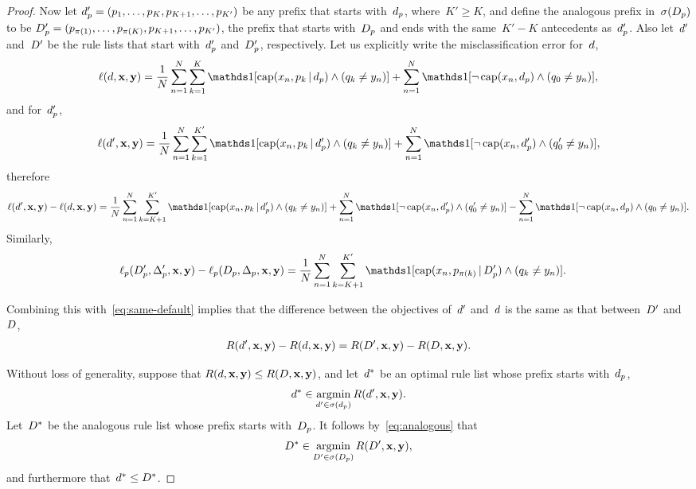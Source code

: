 \begin{proof}
Now let ${d_p' = (p_1, \dots, p_K, p_{K+1}, \dots, p_{K'})}$
be any prefix that starts with~$d_p$, where~${K' \ge K}$,
and define the analogous prefix in~$\sigma(D_p)$ to be
${D_p' = (p_{\pi(1)}, \dots, p_{\pi(K)}, p_{K+1}, \dots, p_{K'})}$,
\ie the prefix that starts with~$D_p$
and ends with the same~${K'-K}$ antecedents as~$d_p'$.
%
Also let~${d}'$ and~${D}'$ be the rule lists that
start with~$d_p'$ and~$D_p'$, respectively.
%
Let us explicitly write the misclassification error for~${d}$,
\begin{align}
\Loss(\RL, \x, \y) = \frac{1}{N} \sum_{n=1}^N \sum_{k=1}^K
\one [ \Cap(x_n, p_k \given \Prefix) \wedge (q_k \neq y_n) ]
+ \sum_{n=1}^N \one [ \neg\, \Cap(x_n, \Prefix) \wedge (\Default \neq y_n) ],
\end{align}
and for~$d_p'$,
\begin{align}
\Loss(\RL', \x, \y) = \frac{1}{N} \sum_{n=1}^N \sum_{k=1}^{K'}
\one [ \Cap(x_n, p_k \given \Prefix') \wedge (q_k \neq y_n) ]
+ \sum_{n=1}^N \one [ \neg\, \Cap(x_n, \Prefix') \wedge (\Default' \neq y_n) ],
\end{align}
therefore
\begin{align}
\Loss(\RL', \x, \y) - \Loss(\RL, \x, \y)
= \frac{1}{N} \sum_{n=1}^N \sum_{k=K+1}^{K'}
\one [ \Cap(x_n, p_k \given \Prefix') \wedge (q_k \neq y_n) ]
+ \sum_{n=1}^N \one [ \neg\, \Cap(x_n, \Prefix') \wedge (\Default' \neq y_n) ]
- \sum_{n=1}^N \one [ \neg\, \Cap(x_n, \Prefix) \wedge (\Default \neq y_n) ].
\label{eq:loss-a}
\end{align}
Similarly,
\begin{align}
\Loss_p(\PrefixB', \LabelsB', \x, \y) - \Loss_p(\PrefixB, \LabelsB, \x, \y)
&= \frac{1}{N} \sum_{n=1}^N \sum_{k=K+1}^{K'}
\one [ \Cap(x_n, p_{\pi(k)} \given \PrefixB') \wedge (q_k \neq y_n) ].
\label{eq:loss-b}
\end{align}

%
Combining this with~\eqref{eq:same-default} implies that
the difference between the objectives of~${d}'$ and~${d}$
is the same as that between~${D}'$ and~${D}$, \ie
\begin{align}
\Obj(\RL', \x, \y) - \Obj(\RL, \x, \y)
= \Obj(\RLB', \x, \y) - \Obj(\RLB, \x, \y).
\label{eq:analogous}
\end{align}

Without loss of generality, suppose that
${R({d}, \mathbf{x}, \mathbf{y}) \le R({D}, \mathbf{x}, \mathbf{y})}$,
and let~${d}^*$ be an optimal rule list whose prefix starts with~$d_p$,
\begin{align}
\RL^* \in \argmin_{\RL' \in \StartsWith(\Prefix)} \Obj(\RL', \x, \y).
\end{align}
Let~${D}^*$ be the analogous rule list whose prefix starts with~$D_p$.
%
It follows by~\eqref{eq:analogous} that
\begin{align}
\RLB^* \in \argmin_{\RLB' \in \StartsWith(\PrefixB)} \Obj(\RLB', \x, \y),
\end{align}
and furthermore that~${{d}^* \le {D}^*}$.
\end{proof}

